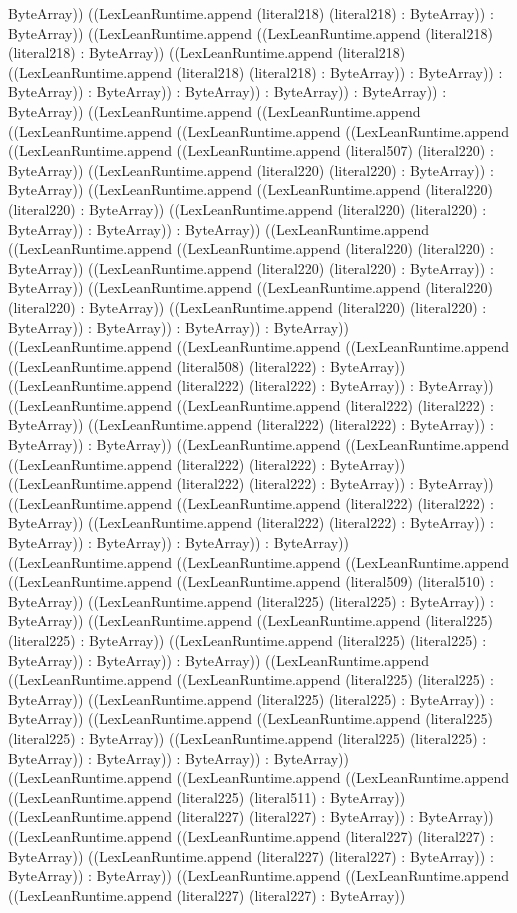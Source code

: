 \documentclass[11pt]{article}
\begin{document}
ByteArray)) ((LexLeanRuntime.append (literal218) (literal218) : ByteArray)) : ByteArray)) ((LexLeanRuntime.append ((LexLeanRuntime.append (literal218) (literal218) : ByteArray)) ((LexLeanRuntime.append (literal218) ((LexLeanRuntime.append (literal218) (literal218) : ByteArray)) : ByteArray)) : ByteArray)) : ByteArray)) : ByteArray)) : ByteArray)) : ByteArray)) : ByteArray)) ((LexLeanRuntime.append ((LexLeanRuntime.append ((LexLeanRuntime.append ((LexLeanRuntime.append ((LexLeanRuntime.append ((LexLeanRuntime.append ((LexLeanRuntime.append (literal507) (literal220) : ByteArray)) ((LexLeanRuntime.append (literal220) (literal220) : ByteArray)) : ByteArray)) ((LexLeanRuntime.append ((LexLeanRuntime.append (literal220) (literal220) : ByteArray)) ((LexLeanRuntime.append (literal220) (literal220) : ByteArray)) : ByteArray)) : ByteArray)) ((LexLeanRuntime.append ((LexLeanRuntime.append ((LexLeanRuntime.append (literal220) (literal220) : ByteArray)) ((LexLeanRuntime.append (literal220) (literal220) : ByteArray)) : ByteArray)) ((LexLeanRuntime.append ((LexLeanRuntime.append (literal220) (literal220) : ByteArray)) ((LexLeanRuntime.append (literal220) (literal220) : ByteArray)) : ByteArray)) : ByteArray)) : ByteArray)) ((LexLeanRuntime.append ((LexLeanRuntime.append ((LexLeanRuntime.append ((LexLeanRuntime.append (literal508) (literal222) : ByteArray)) ((LexLeanRuntime.append (literal222) (literal222) : ByteArray)) : ByteArray)) ((LexLeanRuntime.append ((LexLeanRuntime.append (literal222) (literal222) : ByteArray)) ((LexLeanRuntime.append (literal222) (literal222) : ByteArray)) : ByteArray)) : ByteArray)) ((LexLeanRuntime.append ((LexLeanRuntime.append ((LexLeanRuntime.append (literal222) (literal222) : ByteArray)) ((LexLeanRuntime.append (literal222) (literal222) : ByteArray)) : ByteArray)) ((LexLeanRuntime.append ((LexLeanRuntime.append (literal222) (literal222) : ByteArray)) ((LexLeanRuntime.append (literal222) (literal222) : ByteArray)) : ByteArray)) : ByteArray)) : ByteArray)) : ByteArray)) ((LexLeanRuntime.append ((LexLeanRuntime.append ((LexLeanRuntime.append ((LexLeanRuntime.append ((LexLeanRuntime.append (literal509) (literal510) : ByteArray)) ((LexLeanRuntime.append (literal225) (literal225) : ByteArray)) : ByteArray)) ((LexLeanRuntime.append ((LexLeanRuntime.append (literal225) (literal225) : ByteArray)) ((LexLeanRuntime.append (literal225) (literal225) : ByteArray)) : ByteArray)) : ByteArray)) ((LexLeanRuntime.append ((LexLeanRuntime.append ((LexLeanRuntime.append (literal225) (literal225) : ByteArray)) ((LexLeanRuntime.append (literal225) (literal225) : ByteArray)) : ByteArray)) ((LexLeanRuntime.append ((LexLeanRuntime.append (literal225) (literal225) : ByteArray)) ((LexLeanRuntime.append (literal225) (literal225) : ByteArray)) : ByteArray)) : ByteArray)) : ByteArray)) ((LexLeanRuntime.append ((LexLeanRuntime.append ((LexLeanRuntime.append ((LexLeanRuntime.append (literal225) (literal511) : ByteArray)) ((LexLeanRuntime.append (literal227) (literal227) : ByteArray)) : ByteArray)) ((LexLeanRuntime.append ((LexLeanRuntime.append (literal227) (literal227) : ByteArray)) ((LexLeanRuntime.append (literal227) (literal227) : ByteArray)) : ByteArray)) : ByteArray)) ((LexLeanRuntime.append ((LexLeanRuntime.append ((LexLeanRuntime.append (literal227) (literal227) : ByteArray)) 
\end{document}
